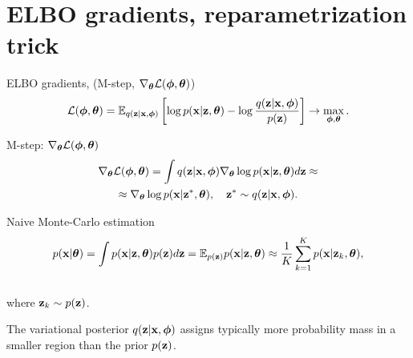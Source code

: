 	\section{ELBO gradients, reparametrization trick}
	\begin{frame}{ELBO gradients, (M-step, $\nabla_{\boldsymbol{\theta}} \mathcal{L}(\boldsymbol{\phi}, \boldsymbol{\theta})$)}
		\[
		\mathcal{L} (\boldsymbol{\phi}, \boldsymbol{\theta})  = \mathbb{E}_{q(\mathbf{z} | \mathbf{x}, \boldsymbol{\phi})} \left[\log p(\mathbf{x} | \mathbf{z}, \boldsymbol{\theta}) - \log \frac{q(\mathbf{z} | \mathbf{x}, \boldsymbol{\phi})}{p(\mathbf{z})} \right] \rightarrow \max_{\boldsymbol{\phi}, \boldsymbol{\theta}}.
		\]	
		\vspace{-0.5cm}
		\begin{block}{M-step: $\nabla_{\boldsymbol{\theta}} \mathcal{L}(\boldsymbol{\phi}, \boldsymbol{\theta})$}
			\vspace{-0.7cm}
			\begin{multline*}
				\nabla_{\boldsymbol{\theta}} \mathcal{L} (\boldsymbol{\phi}, \boldsymbol{\theta})
				= \int q(\mathbf{z}|\mathbf{x}, \boldsymbol{\phi}) \nabla_{\boldsymbol{\theta}}\log p(\mathbf{x}|\mathbf{z}, \boldsymbol{\theta}) d \mathbf{z} \approx  \\
				\approx \nabla_{\boldsymbol{\theta}}\log p(\mathbf{x}|\mathbf{z}^*, \boldsymbol{\theta}), \quad \mathbf{z}^* \sim q(\mathbf{z}|\mathbf{x}, \boldsymbol{\phi}).
			\end{multline*}
			\vspace{-0.9cm}
		\end{block}
		\begin{block}{Naive Monte-Carlo estimation}
			\vspace{-0.7cm}
			\[
			p(\mathbf{x} | \boldsymbol{\theta}) = \int p(\mathbf{x} | \mathbf{z}, \boldsymbol{\theta}) p(\mathbf{z}) d\mathbf{z} = \mathbb{E}_{p(\mathbf{z})} p(\mathbf{x} | \mathbf{z}, \boldsymbol{\theta}) \approx \frac{1}{K} \sum_{k=1}^{K} p(\mathbf{x} | \mathbf{z}_k, \boldsymbol{\theta}),
			\]
			\vspace{-0.5cm} \\
			where $\mathbf{z}_k \sim p(\mathbf{z})$. 
		\end{block}
		The variational posterior $q(\mathbf{z}|\mathbf{x}, \boldsymbol{\phi})$ assigns typically more probability mass in a smaller region than the prior $p(\mathbf{z})$. 
	\end{frame}
